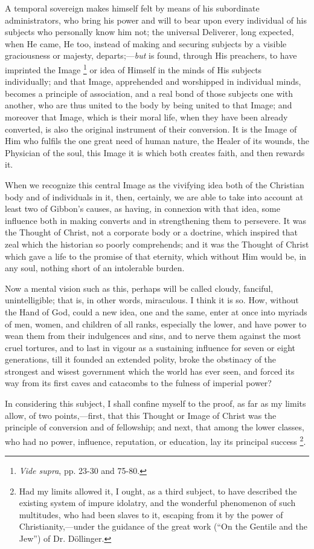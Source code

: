 A temporal sovereign makes himself felt by means of his subordinate
administrators, who bring his power and will to bear upon every
individual of his subjects who personally know him not; the universal
Deliverer, long expected, when He came, He too, instead of making and
securing subjects by a visible graciousness or majesty, departs;—\emph{but}
is found, through His preachers, to have imprinted the Image \footnote{\emph{Vide supra},
pp. 23-30 and 75-80.} or idea of Himself in the minds of His subjects individually;
and that Image, apprehended and worshipped in individual minds,
becomes a principle of association, and a real bond of those subjects
one with another, who are thus united to the body by being united to
that Image; and moreover that Image, which is their moral life, when
they have been already converted, is also the original instrument of
their conversion. It is the Image of Him who fulfils the one great
need of human nature, the Healer of its wounds, the Physician of the
soul, this Image it is which both creates faith, and then rewards it.

When we recognize this central Image as the vivifying idea both of
the Christian body and of individuals in it, then, certainly, we are
able to take into account at least two of Gibbon's causes, as having,
in connexion with that idea, some influence both in making converts
and in strengthening them to persevere. It was the Thought of Christ,
not a corporate body or a doctrine, which inspired that zeal which the
historian so poorly comprehends; and it was the Thought of Christ
which gave a life to the promise of that eternity, which without Him
would be, in any soul, nothing short of an intolerable burden.

Now a mental vision such as this, perhaps will be called cloudy,
fanciful, unintelligible; that is, in other words, miraculous. I think
it is so. How, without the Hand of God, could a new idea, one and the
same, enter at once into myriads of men, women, and children of all
ranks, especially the lower, and have power to wean them from their
indulgences and sins, and to nerve them against the most cruel
tortures, and to last in vigour as a sustaining influence for seven or
eight generations, till it founded an extended polity, broke the
obstinacy of the strongest and wisest government which the world has
ever seen, and forced its way from its first caves and catacombs to
the fulness of imperial power?

In considering this subject, I shall confine myself to the proof,
as far as my limits allow, of two points,—first, that this Thought or
Image of Christ was the principle of conversion and of fellowship; and
next, that among the lower classes, who had no power, influence,
reputation, or education, lay its principal success \footnote{Had my limits
allowed it, I ought, as a third subject, to have described the
existing system of impure idolatry, and the wonderful phenomenon of
such multitudes, who had been slaves to it, escaping from it by the
power of Christianity,—under the guidance of the great work
(``On the Gentile and the Jew'') of Dr. Döllinger.}.

